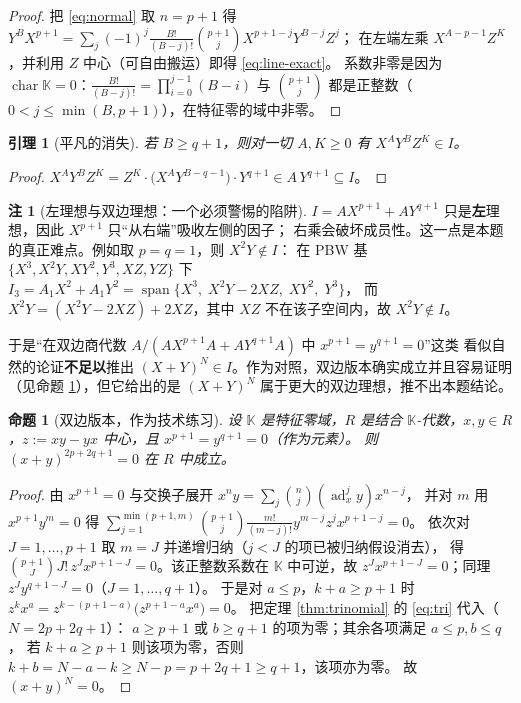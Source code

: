 \documentclass[11pt,UTF8]{ctexart}
\newtheorem{lemma}[theorem]{引理}
\newtheorem{proposition}[theorem]{命题}
\theoremstyle{definition}
\newtheorem{remark}[theorem]{注}
\newcommand{\ad}{\operatorname{ad}}
\newcommand{\chr}{\operatorname{char}}
\newcommand{\K}{\mathbb{K}}
\begin{document}
\begin{proof}
把 \eqref{eq:normal} 取 $n=p+1$ 得
$Y^{B}X^{p+1}=\sum_{j}(-1)^{j}\frac{B!}{(B-j)!}\binom{p+1}{j}X^{p+1-j}Y^{B-j}Z^{j}$；
在左端左乘 $X^{A-p-1}Z^{K}$，并利用 $Z$ 中心（可自由搬运）即得 \eqref{eq:line-exact}。
系数非零是因为 $\chr\K=0$：$\frac{B!}{(B-j)!}=\prod_{i=0}^{j-1}(B-i)$ 与 $\binom{p+1}{j}$
都是正整数（$0<j\le\min(B,p+1)$），在特征零的域中非零。
\end{proof}

\begin{lemma}[平凡的消失]\label{lem:triv}
若 $B\ge q+1$，则对一切 $A,K\ge0$ 有 $X^{A}Y^{B}Z^{K}\in I$。
\end{lemma}

\begin{proof}
$X^{A}Y^{B}Z^{K}=Z^{K}\cdot\bigl(X^{A}Y^{B-q-1}\bigr)\cdot Y^{q+1}\in A\,Y^{q+1}\subseteq I$。
\end{proof}

\begin{remark}[左理想与双边理想：一个必须警惕的陷阱]\label{rem:two-sided}
$I=AX^{p+1}+AY^{q+1}$ 只是\textbf{左}理想，因此 $X^{p+1}$ 只“从右端”吸收左侧的因子；
右乘会破坏成员性。这一点是本题的真正难点。例如取 $p=q=1$，则 $X^{2}Y\notin I$：
在 PBW 基 $\{X^3,X^2Y,XY^2,Y^3,XZ,YZ\}$ 下
$I_3=A_1X^2+A_1Y^2=\operatorname{span}\{X^3,\;X^2Y-2XZ,\;XY^2,\;Y^3\}$，
而 $X^2Y=(X^2Y-2XZ)+2XZ$，其中 $XZ$ 不在该子空间内，故 $X^2Y\notin I$。

于是“在双边商代数 $A/(AX^{p+1}A+AY^{q+1}A)$ 中 $x^{p+1}=y^{q+1}=0$”这类
看似自然的论证\textbf{不足以}推出 $(X+Y)^N\in I$。作为对照，双边版本确实成立并且容易证明
（见命题 \ref{prop:twosided}），但它给出的是 $(X+Y)^N$ 属于更大的双边理想，推不出本题结论。
\end{remark}

\begin{proposition}[双边版本，作为技术练习]\label{prop:twosided}
设 $\K$ 是特征零域，$R$ 是结合 $\K$-代数，$x,y\in R$，$z:=xy-yx$ 中心，且 $x^{p+1}=y^{q+1}=0$（作为元素）。
则 $(x+y)^{2p+2q+1}=0$ 在 $R$ 中成立。
\end{proposition}

\begin{proof}
由 $x^{p+1}=0$ 与交换子展开 $x^{n}y=\sum_j\binom{n}{j}(\ad_x^{j}y)x^{n-j}$，
并对 $m$ 用 $x^{p+1}y^{m}=0$ 得
$\sum_{j=1}^{\min(p+1,m)}\binom{p+1}{j}\frac{m!}{(m-j)!}y^{m-j}z^{j}x^{p+1-j}=0$。
依次对 $J=1,\dots,p+1$ 取 $m=J$ 并递增归纳（$j<J$ 的项已被归纳假设消去），
得 $\binom{p+1}{J}J!\,z^{J}x^{p+1-J}=0$。该正整数系数在 $\K$ 中可逆，故 $z^{J}x^{p+1-J}=0$；同理 $z^{J}y^{q+1-J}=0$（$J=1,\dots,q+1$）。
于是对 $a\le p$，$k+a\ge p+1$ 时 $z^{k}x^{a}=z^{k-(p+1-a)}\bigl(z^{p+1-a}x^{a}\bigr)=0$。
把定理 \ref{thm:trinomial} 的 \eqref{eq:tri} 代入（$N=2p+2q+1$）：
$a\ge p+1$ 或 $b\ge q+1$ 的项为零；其余各项满足 $a\le p,b\le q$，
若 $k+a\ge p+1$ 则该项为零，否则 $k+b=N-a-k\ge N-p=p+2q+1\ge q+1$，该项亦为零。
故 $(x+y)^{N}=0$。
\end{proof}
\end{document}
